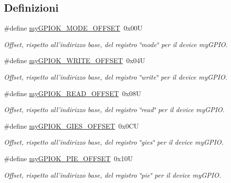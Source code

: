 \subsection*{Definizioni}
\begin{DoxyCompactItemize}
\item 
\#define \hyperlink{group__ausiliarie_ga543e17293942b7cf7936a5e095ddc7ef}{my\+G\+P\+I\+O\+K\+\_\+\+M\+O\+D\+E\+\_\+\+O\+F\+F\+S\+E\+T}~0x00\+U
\begin{DoxyCompactList}\small\item\em Offset, rispetto all'indirizzo base, del registro \char`\"{}mode\char`\"{} per il device my\+G\+P\+I\+O. \end{DoxyCompactList}\item 
\#define \hyperlink{group__ausiliarie_gac165a5d828f3df41e78bb02d4ef38327}{my\+G\+P\+I\+O\+K\+\_\+\+W\+R\+I\+T\+E\+\_\+\+O\+F\+F\+S\+E\+T}~0x04\+U
\begin{DoxyCompactList}\small\item\em Offset, rispetto all'indirizzo base, del registro \char`\"{}write\char`\"{} per il device my\+G\+P\+I\+O. \end{DoxyCompactList}\item 
\#define \hyperlink{group__ausiliarie_gabdb25f3ecdfbf053f4ca207930a56599}{my\+G\+P\+I\+O\+K\+\_\+\+R\+E\+A\+D\+\_\+\+O\+F\+F\+S\+E\+T}~0x08\+U
\begin{DoxyCompactList}\small\item\em Offset, rispetto all'indirizzo base, del registro \char`\"{}read\char`\"{} per il device my\+G\+P\+I\+O. \end{DoxyCompactList}\item 
\#define \hyperlink{group__ausiliarie_ga0da2526ca3cd1a94ebcecf96778ea2e5}{my\+G\+P\+I\+O\+K\+\_\+\+G\+I\+E\+S\+\_\+\+O\+F\+F\+S\+E\+T}~0x0\+C\+U
\begin{DoxyCompactList}\small\item\em Offset, rispetto all'indirizzo base, del registro \char`\"{}gies\char`\"{} per il device my\+G\+P\+I\+O. \end{DoxyCompactList}\item 
\#define \hyperlink{group__ausiliarie_ga2ed7646e6f910f5803477e51b7fe26e3}{my\+G\+P\+I\+O\+K\+\_\+\+P\+I\+E\+\_\+\+O\+F\+F\+S\+E\+T}~0x10\+U
\begin{DoxyCompactList}\small\item\em Offset, rispetto all'indirizzo base, del registro \char`\"{}pie\char`\"{} per il device my\+G\+P\+I\+O. \end{DoxyCompactList}\item 

\end{DoxyCompactItemize}
